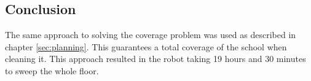 \subsection{Conclusion}
The same approach to solving the coverage problem was used as described in chapter \ref{sec:planning}. This guarantees a total coverage of the school when cleaning it. 
This approach resulted in the robot taking 19 hours and 30 minutes to sweep the whole floor.
